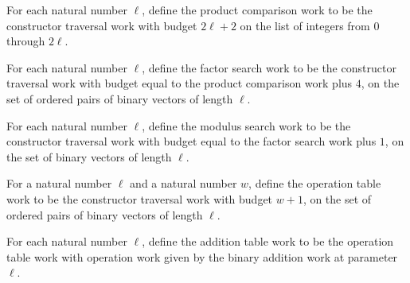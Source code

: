 \begin{definition}
\label{FABL.binaryProductComparisonWork}
\leanok
{}
For each natural number $\ell$, define the product comparison work to be the constructor
traversal work with budget $2\ell+2$ on the list of integers from $0$ through $2\ell$.
\end{definition}

\begin{definition}
\label{FABL.binaryFactorSearchWork}
\leanok
{}
For each natural number $\ell$, define the factor search work to be the constructor
traversal work with budget equal to the product comparison work plus $4$, on the set of
ordered pairs of binary vectors of length $\ell$.
\end{definition}

\begin{definition}
\label{FABL.binaryModulusSearchWork}
\leanok
{}
For each natural number $\ell$, define the modulus search work to be the constructor
traversal work with budget equal to the factor search work plus $1$, on the set of
binary vectors of length $\ell$.
\end{definition}

\begin{definition}
\label{FABL.binaryOperationTableWork}
\leanok
{}
For a natural number $\ell$ and a natural number $w$, define the operation table work to
be the constructor traversal work with budget $w+1$, on the set of ordered pairs of
binary vectors of length $\ell$.
\end{definition}

\begin{definition}
\label{FABL.binaryAdditionTableWork}
\leanok
{}
For each natural number $\ell$, define the addition table work to be the operation table
work with operation work given by the binary addition work at parameter $\ell$.
\end{definition}

